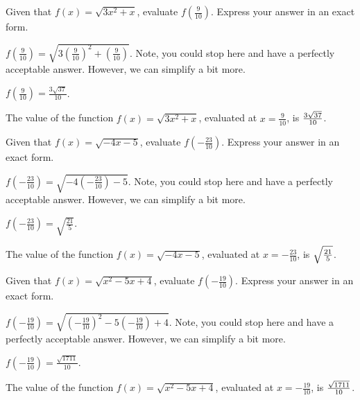 \begin{shuffle}
\begin{exercise}
Given that $f(x)=\sqrt{3 x^2+x}$, evaluate $f\left(\frac{9}{10}\right)$. Express your answer in an exact form.
\begin{solution}
\begin{hint}
$f\left(\frac{9}{10}\right)=\sqrt{3 (\frac{9}{10})^2+(\frac{9}{10})}$. Note, you could stop here and have a perfectly acceptable answer. However, we can simplify a bit more. 
\end{hint}
\begin{hint}
$f\left(\frac{9}{10}\right)=\frac{3 \sqrt{37}}{10}$.
\end{hint}
The value of the function $f(x) = \sqrt{3 x^2+x}$, evaluated at $x=\frac{9}{10}$, is ${\frac{3 \sqrt{37}}{10}}$.
\end{solution}
\end{exercise}

\begin{exercise}
Given that $f(x)=\sqrt{-4 x-5}$, evaluate $f\left(-\frac{23}{10}\right)$. Express your answer in an exact form.
\begin{solution}
\begin{hint}
$f\left(-\frac{23}{10}\right)=\sqrt{-4 (-\frac{23}{10})-5}$. Note, you could stop here and have a perfectly acceptable answer. However, we can simplify a bit more. 
\end{hint}
\begin{hint}
$f\left(-\frac{23}{10}\right)=\sqrt{\frac{21}{5}}$.
\end{hint}
The value of the function $f(x) = \sqrt{-4 x-5}$, evaluated at $x=-\frac{23}{10}$, is ${\sqrt{\frac{21}{5}}}$.
\end{solution}
\end{exercise}

\begin{exercise}
Given that $f(x)=\sqrt{x^2-5 x+4}$, evaluate $f\left(-\frac{19}{10}\right)$. Express your answer in an exact form.
\begin{solution}
\begin{hint}
$f\left(-\frac{19}{10}\right)=\sqrt{(-\frac{19}{10})^2-5 (-\frac{19}{10})+4}$. Note, you could stop here and have a perfectly acceptable answer. However, we can simplify a bit more. 
\end{hint}
\begin{hint}
$f\left(-\frac{19}{10}\right)=\frac{\sqrt{1711}}{10}$.
\end{hint}
The value of the function $f(x) = \sqrt{x^2-5 x+4}$, evaluated at $x=-\frac{19}{10}$, is ${\frac{\sqrt{1711}}{10}}$.
\end{solution}
\end{exercise}


\end{shuffle}
